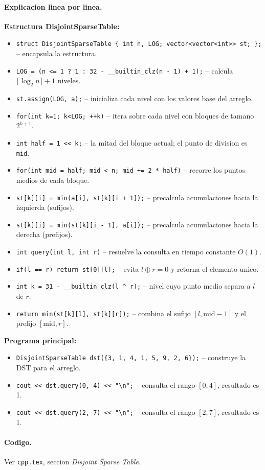 \paragraph{Explicacion linea por linea.}
\textbf{Estructura DisjointSparseTable:}
\begin{itemize}\setlength\itemsep{0pt}
	\item \verb|struct DisjointSparseTable { int n, LOG; vector<vector<int>> st; };| -- encapsula la estructura.
	\item \verb|LOG = (n <= 1 ? 1 : 32 - __builtin_clz(n - 1) + 1);| -- calcula $\lceil \log_2 n \rceil + 1$ niveles.
	\item \verb|st.assign(LOG, a);| -- inicializa cada nivel con los valores base del arreglo.
	\item \verb|for(int k=1; k<LOG; ++k)| -- itera sobre cada nivel con bloques de tamano $2^{k+1}$.
	\item \verb|int half = 1 << k;| -- la mitad del bloque actual; el punto de division es \texttt{mid}.
	\item \verb|for(int mid = half; mid < n; mid += 2 * half)| -- recorre los puntos medios de cada bloque.
	\item \verb|st[k][i] = min(a[i], st[k][i + 1]);| -- precalcula acumulaciones hacia la izquierda (sufijos).
	\item \verb|st[k][i] = min(st[k][i - 1], a[i]);| -- precalcula acumulaciones hacia la derecha (prefijos).
	\item \verb|int query(int l, int r)| -- resuelve la consulta en tiempo constante $O(1)$.
	\item \verb|if(l == r) return st[0][l];| -- evita $l \oplus r = 0$ y retorna el elemento unico.
	\item \verb|int k = 31 - __builtin_clz(l ^ r);| -- nivel cuyo punto medio separa a $l$ de $r$.
	\item \verb|return min(st[k][l], st[k][r]);| -- combina el sufijo $[l, \text{mid}-1]$ y el prefijo $[\text{mid}, r]$.
\end{itemize}
\textbf{Programa principal:}
\begin{itemize}\setlength\itemsep{0pt}
	\item \verb|DisjointSparseTable dst({3, 1, 4, 1, 5, 9, 2, 6});| -- construye la DST para el arreglo.
	\item \verb|cout << dst.query(0, 4) << "\n";| -- consulta el rango $[0, 4]$, resultado es 1.
	\item \verb|cout << dst.query(2, 7) << "\n";| -- consulta el rango $[2, 7]$, resultado es 1.
\end{itemize}

\paragraph{Codigo.}
Ver \texttt{cpp.tex}, seccion \textit{Disjoint Sparse Table}.

\vspace{0.5em}

